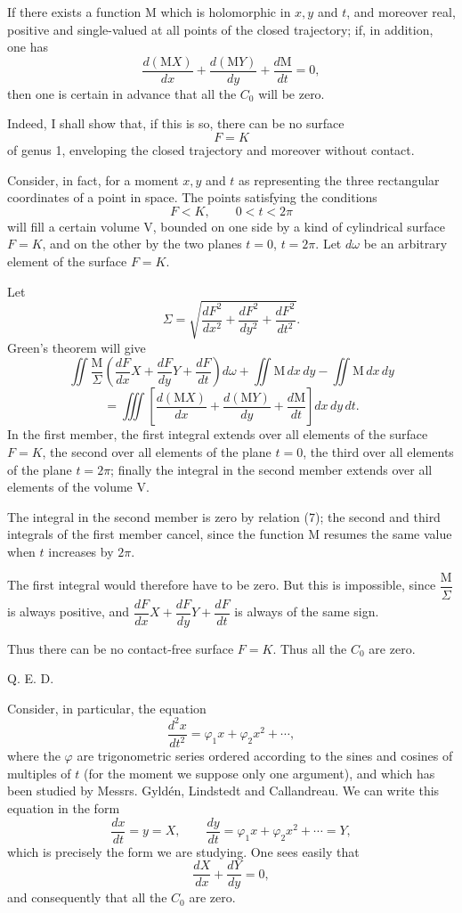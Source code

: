 \documentclass[11pt]{article}
\begin{document}
If there exists a function M which is holomorphic in $x,y$ and $t$, and moreover real, positive and single-valued at all points of the closed trajectory; if, in addition, one has
\begin{equation}
\frac{d(\mathrm{M}X)}{dx}+\frac{d(\mathrm{M}Y)}{dy}+\frac{d\mathrm{M}}{dt}=0,
\tag{7}
\end{equation}
then one is certain in advance that all the $C_0$ will be zero.

Indeed, I shall show that, if this is so, there can be no surface
\[
F=K
\]
of genus 1, enveloping the closed trajectory and moreover without contact.

Consider, in fact, for a moment $x,y$ and $t$ as representing the three rectangular coordinates of a point in space. The points satisfying the conditions
\[
F<K,
\qquad 0<t<2\pi
\]
will fill a certain volume V, bounded on one side by a kind of cylindrical surface $F=K$, and on the other by the two planes $t=0$, $t=2\pi$. Let $d\omega$ be an arbitrary element of the surface $F=K$.

Let
\[
\Sigma=\sqrt{\frac{dF^2}{dx^2}+\frac{dF^2}{dy^2}+\frac{dF^2}{dt^2}}.
\]
Green’s theorem will give
\[
\iint \frac{\mathrm{M}}{\Sigma}\left(\frac{dF}{dx}X+\frac{dF}{dy}Y+\frac{dF}{dt}\right)d\omega
+\iint \mathrm{M}\,dx\,dy-\iint \mathrm{M}\,dx\,dy
\]
\[
=\iiint\left[\frac{d(\mathrm{M}X)}{dx}+\frac{d(\mathrm{M}Y)}{dy}+\frac{d\mathrm{M}}{dt}\right]dx\,dy\,dt.
\]
In the first member, the first integral extends over all elements of the surface $F=K$, the second over all elements of the plane $t=0$, the third over all elements of the plane $t=2\pi$; finally the integral in the second member extends over all elements of the volume V.

The integral in the second member is zero by relation (7); the second and third integrals of the first member cancel, since the function M resumes the same value when $t$ increases by $2\pi$.

The first integral would therefore have to be zero. But this is impossible, since $\dfrac{\mathrm{M}}{\Sigma}$ is always positive, and $\dfrac{dF}{dx}X+\dfrac{dF}{dy}Y+\dfrac{dF}{dt}$ is always of the same sign.

Thus there can be no contact-free surface $F=K$. Thus all the $C_0$ are zero.
\begin{flushright}Q. E. D.\end{flushright}

Consider, in particular, the equation
\[
\frac{d^2x}{dt^2}=\varphi_1x+\varphi_2x^2+\cdots,
\]
where the $\varphi$ are trigonometric series ordered according to the sines and cosines of multiples of $t$ (for the moment we suppose only one argument), and which has been studied by Messrs. Gyldén, Lindstedt and Callandreau. We can write this equation in the form
\[
\frac{dx}{dt}=y=X,
\qquad
\frac{dy}{dt}=\varphi_1x+\varphi_2x^2+\cdots=Y,
\]
which is precisely the form we are studying. One sees easily that
\[
\frac{dX}{dx}+\frac{dY}{dy}=0,
\]
and consequently that all the $C_0$ are zero.
\end{document}
